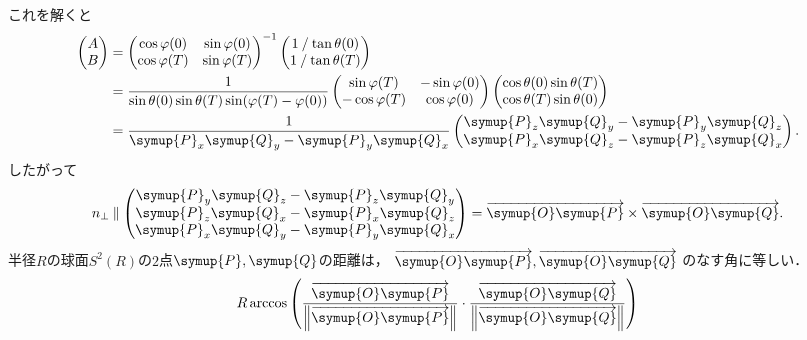 \documentclass{ltjsarticle}
\begin{document}
これを解くと
\begin{align*}
    \begin{pmatrix}
        A \\
        B
    \end{pmatrix}
    &=
    \begin{pmatrix}
        \cos \varphi(0) & \sin \varphi(0) \\
        \cos \varphi(T) & \sin \varphi(T)
    \end{pmatrix}^{-1}
    \begin{pmatrix}
        \inlinefrac{1}{\tan \theta(0)} \\
        \inlinefrac{1}{\tan \theta(T)}
    \end{pmatrix} \\
    &=
    \frac{1}{\sin \theta(0) \sin \theta(T)\sin (\varphi(T) - \varphi(0))}
    \begin{pmatrix}
        \sin \varphi(T) & - \sin \varphi(0) \\
        - \cos \varphi(T) & \cos \varphi(0)
    \end{pmatrix}
    \begin{pmatrix}
        \cos \theta(0) \sin \theta(T) \\
        \cos \theta(T) \sin \theta(0)
    \end{pmatrix}
    \\
    &=
    \frac{1}{\symup{P}_x\symup{Q}_y - \symup{P}_y \symup{Q}_x}
    \begin{pmatrix}
        \symup{P}_z \symup{Q}_y - \symup{P}_y \symup{Q}_z \\
        \symup{P}_x \symup{Q}_z - \symup{P}_z \symup{Q}_x
    \end{pmatrix}.
\end{align*}
したがって
\begin{align*}
    n_\bot \mathbin{\|}
        \begin{pmatrix}
            \symup{P}_y \symup{Q}_z - \symup{P}_z \symup{Q}_y \\
            \symup{P}_z \symup{Q}_x - \symup{P}_x \symup{Q}_z \\
            \symup{P}_x\symup{Q}_y - \symup{P}_y \symup{Q}_x
        \end{pmatrix}
        = \overrightarrow{\symup{O}\symup{P}} \times \overrightarrow{\symup{O}\symup{Q}}.
\end{align*}
半径\(R\)の球面\(S^2(R)\)の\(2\)点\(\symup{P}, \symup{Q}\)の距離は，
\(\overrightarrow{\symup{O}\symup{P}}, \overrightarrow{\symup{O}\symup{Q}}\)
のなす角に等しい．
\begin{align*}
    R \arccos \left(%
        \frac{%
            \overrightarrow{\symup{O}\symup{P}}
        }{%
            \left\lVert \overrightarrow{\symup{O}\symup{P}} \right\rVert
        } \cdot
        \frac{%
            \overrightarrow{\symup{O}\symup{Q}}
        }{%
            \left\lVert \overrightarrow{\symup{O}\symup{Q}} \right\rVert
        }
    \right)
\end{align*}
\end{document}
